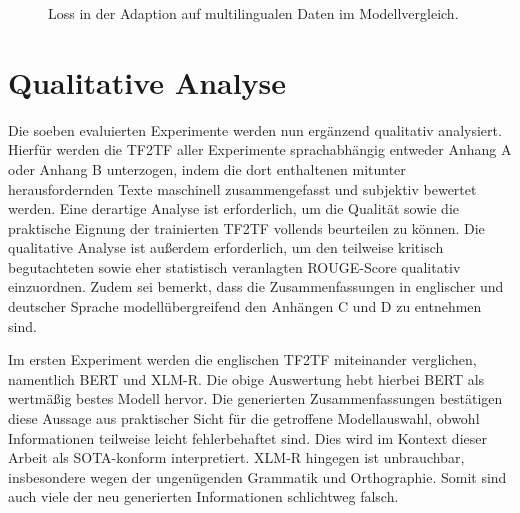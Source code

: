 \begin{figure}[h]
  \centering
  \caption{Loss in der Adaption auf multilingualen Daten im Modellvergleich.}
  \label{pic:ExpMlLoss}
\end{figure}


\section{Qualitative Analyse}
\noindent
Die soeben evaluierten Experimente werden nun ergänzend qualitativ analysiert. Hierfür werden die \ac{TF2TF} aller Experimente sprachabhängig entweder Anhang A oder Anhang B unterzogen, indem die dort enthaltenen mitunter herausfordernden Texte maschinell zusammengefasst und subjektiv bewertet werden. Eine derartige Analyse ist erforderlich, um die Qualität sowie die praktische Eignung der trainierten \ac{TF2TF} vollends beurteilen zu können. Die qualitative Analyse ist außerdem erforderlich, um den teilweise kritisch begutachteten sowie eher statistisch veranlagten \ac{ROUGE}-Score qualitativ einzuordnen. Zudem sei bemerkt, dass die Zusammenfassungen in englischer und deutscher Sprache modellübergreifend den Anhängen C und D zu entnehmen sind.
\newpage

\noindent
Im ersten Experiment werden die englischen \ac{TF2TF} miteinander verglichen, namentlich \ac{BERT} und \ac{XLM-R}. Die obige Auswertung hebt hierbei \ac{BERT} als wertmäßig bestes Modell hervor. Die generierten Zusammenfassungen bestätigen diese Aussage aus praktischer Sicht für die getroffene Modellauswahl, obwohl Informationen teilweise leicht fehlerbehaftet sind. Dies wird im Kontext dieser Arbeit als \ac{SOTA}-konform interpretiert. \ac{XLM-R} hingegen ist unbrauchbar, insbesondere wegen der ungenügenden Grammatik und Orthographie. Somit sind auch viele der neu generierten Informationen schlichtweg falsch.\\

